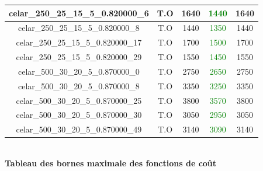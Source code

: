 \documentclass[a4paper, 10pt]{article}
\begin{document}
\begin{minipage}[t]{0.5\linewidth}
\begin{tabular}{| c | c | c| c| c |}
              \hline
              celar\_250\_25\_15\_5\_0.820000\_6 & \textcolor[gray]{0.6}{T.O} & 1640 & \textcolor{green}{1440} & 1640  \\
              \hline
              celar\_250\_25\_15\_5\_0.820000\_8 &\textcolor[gray]{0.6}{T.O}  & 1440 & \textcolor{green}{1350} & 1440\\
              \hline
              celar\_250\_25\_15\_5\_0.820000\_17 & \textcolor[gray]{0.6}{T.O} & 1700 & \textcolor{green}{1500} & 1700 \\
              \hline
              celar\_250\_25\_15\_5\_0.820000\_29 & \textcolor[gray]{0.6}{T.O}  &  1550 & \textcolor{green}{1450} & 1550 \\
              \hline
              celar\_500\_30\_20\_5\_0.870000\_0 & \textcolor[gray]{0.6}{T.O} & 2750 & \textcolor{green}{2650} & 2750 \\
              \hline
              celar\_500\_30\_20\_5\_0.870000\_8 & \textcolor[gray]{0.6}{T.O} & 3350 & \textcolor{green}{3250} & 3350  \\
              \hline
              celar\_500\_30\_20\_5\_0.870000\_25 & \textcolor[gray]{0.6}{T.O} & 3800 & \textcolor{green}{3570} & 3800  \\
              \hline
              celar\_500\_30\_20\_5\_0.870000\_30 &  \textcolor[gray]{0.6}{T.O} & 3050 & \textcolor{green}{2950} & 3050 \\
              \hline
              celar\_500\_30\_20\_5\_0.870000\_49 &\textcolor[gray]{0.6}{T.O}  & 3140 & \textcolor{green}{3090} & 3140  \\
              \hline
            \end{tabular}
          ~\\
          \centering
          \textbf{\large Tableau des bornes maximale des fonctions de coût} %
        \end{minipage}
        \hfill
\end{document}
